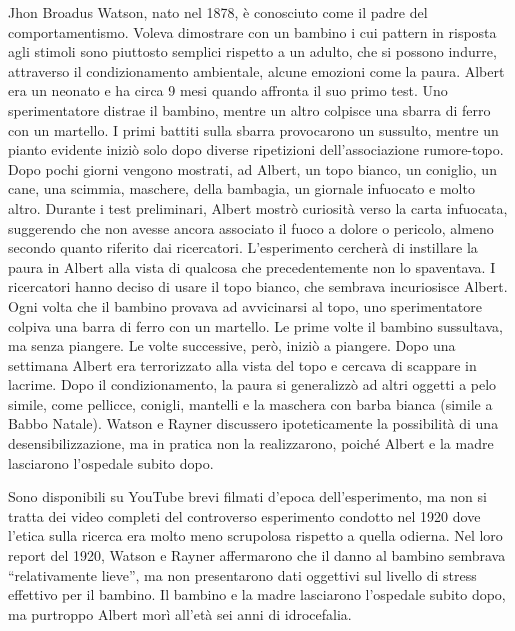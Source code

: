 \documentclass[12pt]{book} %
\begin{document}
\begin{mdframed}[linewidth=1pt]
Jhon Broadus Watson, nato nel 1878, è conosciuto come il padre del comportamentismo. Voleva dimostrare con un bambino i
cui pattern in risposta agli stimoli sono piuttosto semplici rispetto a un adulto, che si possono indurre, attraverso
il condizionamento ambientale, alcune emozioni come la paura. Albert era un neonato e ha circa 9 mesi quando
affronta il suo primo test. Uno sperimentatore distrae il bambino, mentre un altro colpisce una sbarra di ferro con un
martello. I primi battiti sulla sbarra provocarono un sussulto, mentre un pianto evidente iniziò solo dopo diverse ripetizioni dell’associazione rumore-topo. Dopo pochi giorni vengono mostrati, ad Albert, un topo bianco, un coniglio, un cane, una scimmia,
maschere, della bambagia, un giornale infuocato e molto altro. Durante i test preliminari, Albert mostrò curiosità verso la carta infuocata, suggerendo che non avesse ancora associato il fuoco a dolore o pericolo, almeno secondo quanto riferito dai ricercatori. L'esperimento
cercherà di instillare la paura in Albert alla vista di qualcosa che precedentemente non lo spaventava. I ricercatori
hanno deciso di usare il topo bianco, che sembrava incuriosisce Albert. Ogni volta che il bambino provava ad
avvicinarsi al topo, uno sperimentatore colpiva una barra di ferro con un martello. Le prime volte il bambino
sussultava, ma senza piangere. Le volte successive, però, iniziò a piangere. Dopo una settimana Albert era terrorizzato
alla vista del topo e cercava di scappare in lacrime. Dopo il condizionamento, la paura si generalizzò ad altri oggetti a pelo simile, come pellicce, conigli, mantelli e la maschera con barba bianca (simile a Babbo Natale). Watson e Rayner discussero ipoteticamente la possibilità di una desensibilizzazione, ma in pratica non la realizzarono, poiché Albert e la madre lasciarono l’ospedale subito dopo. 

Sono disponibili su YouTube brevi filmati d’epoca dell’esperimento, ma non si tratta dei video completi del controverso esperimento condotto nel 1920 dove l'etica sulla ricerca era molto meno scrupolosa rispetto a quella odierna. 
Nel loro report del 1920, Watson e Rayner affermarono che il danno al bambino sembrava “relativamente lieve”, ma non presentarono dati oggettivi sul livello di stress effettivo per il bambino. Il bambino e la madre lasciarono l'ospedale subito dopo, ma purtroppo Albert morì all'età sei anni di
idrocefalia.
\end{mdframed}
\end{document}
